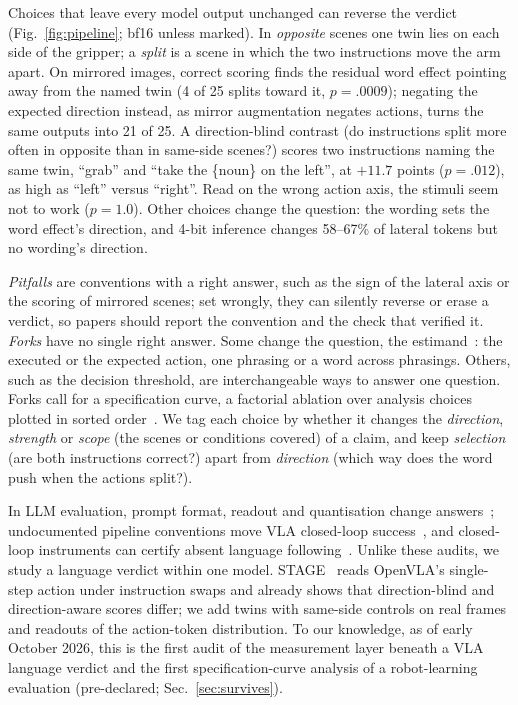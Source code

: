 \documentclass[conference]{IEEEtran}
\begin{document}
Choices that leave every model output unchanged can reverse the verdict (Fig.~\ref{fig:pipeline}; bf16 unless marked). In \emph{opposite} scenes one twin lies on each side of the gripper; a \emph{split} is a scene in which the two instructions move the arm apart. On mirrored images, correct scoring finds the residual word effect pointing away from the named twin (4 of 25 splits toward it, $p=.0009$); negating the expected direction instead, as mirror augmentation negates actions, turns the same outputs into 21 of 25. A direction-blind contrast (do instructions split more often in opposite than in same-side scenes?) scores two instructions naming the same twin, ``grab'' and ``take the \{noun\} on the left'', at $+11.7$ points ($p=.012$), as high as ``left'' versus ``right''. Read on the wrong action axis, the stimuli seem not to work ($p=1.0$). Other choices change the question: the wording sets the word effect's direction, and 4-bit inference changes 58--67\% of lateral tokens but no wording's direction.

\emph{Pitfalls} are conventions with a right answer, such as the sign of the lateral axis or the scoring of mirrored scenes; set wrongly, they can silently reverse or erase a verdict, so papers should report the convention and the check that verified it. \emph{Forks} have no single right answer. Some change the question, the estimand~\cite{lundberg2021what}: the executed or the expected action, one phrasing or a word across phrasings. Others, such as the decision threshold, are interchangeable ways to answer one question. Forks call for a specification curve, a factorial ablation over analysis choices plotted in sorted order~\cite{simonsohn2020specification}. We tag each choice by whether it changes the \emph{direction}, \emph{strength} or \emph{scope} (the scenes or conditions covered) of a claim, and keep \emph{selection} (are both instructions correct?) apart from \emph{direction} (which way does the word push when the actions split?).

In LLM evaluation, prompt format, readout and quantisation change answers~\cite{sclar2024quantifying,wang2024answer,dutta2024accuracy}; undocumented pipeline conventions move VLA closed-loop success~\cite{choi2026vlaeval,islam2026deployment,xu2026vlaquantbench}, and closed-loop instruments can certify absent language following~\cite{kirouane2026measuring}. Unlike these audits, we study a language verdict within one model. STAGE~\cite{jin2026stage} reads OpenVLA's single-step action under instruction swaps and already shows that direction-blind and direction-aware scores differ; we add twins with same-side controls on real frames and readouts of the action-token distribution. To our knowledge, as of early October 2026, this is the first audit of the measurement layer beneath a VLA language verdict and the first specification-curve analysis of a robot-learning evaluation (pre-declared; Sec.~\ref{sec:survives}).
\end{document}

